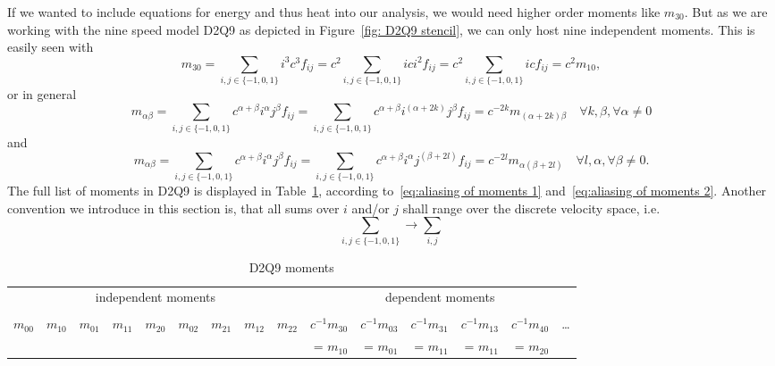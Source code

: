 If we wanted to include equations for energy and thus heat into our analysis, we would need higher order moments like $m_{30}$.
But as we are working with the nine speed model D2Q9 as depicted in Figure~\ref{fig: D2Q9 stencil}, we can only host nine independent moments.
This is easily seen with
\begin{equation}
  m_{30} = \sum_{i,j \in \{-1,0,1\}} i^3 c^3 f_{ij} = c^2\sum_{i,j \in \{-1,0,1\}} ic i^2 f_{ij} = c^2 \sum_{i,j \in \{-1,0,1\}} ic f_{ij} = c^2 m_{10},
\end{equation}
or in general
\begin{equation}
  \label{eq:aliasing of moments 1}
  m_{\alpha\beta}
  = \sum_{i,j \in \{-1,0,1\}} c^{\alpha+\beta} i^\alpha j^\beta f_{ij}
  = \sum_{i,j \in \{-1,0,1\}} c^{\alpha+\beta}i^{(\alpha+2k)} j^\beta f_{ij}
  = c^{-2k} m_{(\alpha+2k)\beta} \quad \forall k,\beta, \forall \alpha \neq 0
\end{equation}
and
\begin{equation}
  \label{eq:aliasing of moments 2}
  m_{\alpha\beta}
  = \sum_{i,j \in \{-1,0,1\}} c^{\alpha+\beta} i^\alpha j^\beta f_{ij}
  = \sum_{i,j \in \{-1,0,1\}} c^{\alpha+\beta}i^\alpha j^{(\beta+2l)} f_{ij}
  = c^{-2l}m_{\alpha(\beta+2l)} \quad \forall l, \alpha, \forall \beta \neq 0.
\end{equation}
The full list of moments in D2Q9 is displayed in Table~\ref{table:D2Q9 moments}, according to~\eqref{eq:aliasing of moments 1} and~\eqref{eq:aliasing of moments 2}.
Another convention we introduce in this section is, that all sums over $i$ and/or $j$ shall range over the discrete velocity space, i.e.
\begin{equation*}
  \sum_{i,j \in \{-1,0,1\}} \rightarrow \sum_{i,j}
\end{equation*}

\setlength{\tabcolsep}{2.9pt}
\begin{table} [t]
  \centering
  \begin{tabular}{r rr rrr rr r rrrrr r}
    \toprule
    \multicolumn{9}{c}{independent moments} & \multicolumn{6}{c}{dependent moments}   \\
    \cmidrule(lr){1-9}\cmidrule(lr){10-15} \\
    $m_{00}$
    & $m_{10}$
    & $m_{01}$
    & $m_{11}$
    & $m_{20}$
    & $m_{02}$
    & $m_{21}$
    & $m_{12}$
    & $m_{22}$
    & $c^{-1}m_{30}$
    & $c^{-1}m_{03}$
    & $c^{-1}m_{31}$
    & $c^{-1}m_{13}$
    & $c^{-1}m_{40}$
    & \ldots \\
    &&&&&&&&
    & = $m_{10}$
    & = $m_{01}$
    & = $m_{11}$
    & = $m_{11}$
    & = $m_{20}$ & \\
    \bottomrule
  \end{tabular}
  \caption{D2Q9 moments}\label{table:D2Q9 moments}
\end{table}
